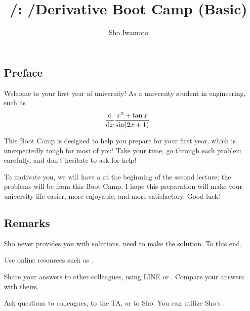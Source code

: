 \documentclass[11pt,pdfa,lastpage]{MishoNote}
\title{\LectureName/: \TitleShort/}
\author{Sho Iwamoto}
\newif\ifBasicForm\BasicFormtrue
\def\TitleShort/{\ifBasicForm{Derivative Boot Camp (Basic)}\else{Derivative Boot Camp}\fi}
\let\origfootnote\footnote
\let\origfootnoterule\footnoterule
\begin{document}
%
\title{\TitleShort/}
\begin{maketitle}
\let\footnote\origfootnote
\let\footnoterule\origfootnoterule

\subsection*{Preface}
Welcome to your first year of university!
As a university student in engineering,  such as
\ifBasicForm \[ \diff{}{x}\frac{x^2+\tan x}{\sin(2x+1)}. \]
\else        \[ \diff{}{x}\frac{x^2+\tan(\ln x)}{\sinh(2x^2+1)}. \] \fi
This Boot Camp is designed to help you prepare for your first year, which is unexpectedly tough for most of you!
Take your time, go through each problem carefully, and don't hesitate to ask for help!

\ifBasicForm\relax\else
 \par\smallskip
  The problems are classified into four categories:
  $\bigstar$ (minimal), $^{***}$ (basic), $^{**}$ (intermediate), and $^{*}$ (for motivated students).
  I guess you already have solved all the \emph{minimal} problems, which is sufficient as the very fresh university student.
  It is always nice to try to solve as many as you can because eventually you will have to learn them all, but recall that they are not essential for now and you can stop wherever you want.
 \par\smallskip
\fi

To motivate you, we will have a  at the beginning of the second lecture; the problems will be from \ifBasicForm{this Boot Camp}\else{the minimal problems of this boot camp}\fi.
I hope this preparation will make your university life easier, more enjoyable, and more satisfactory. Good luck!

\subsection*{Remarks}
Sho never provides you with solutions.  need to make the solution. To this end,
\begin{miniitemize}
  \item Use online resources such as .
  \item Share your answers to other colleagues, using LINE or . Compare your answers with theirs.
  \item Ask questions to colleagues, to the TA, or to Sho. You can utilize Sho's .
\end{miniitemize}


\end{maketitle}
\end{document}
